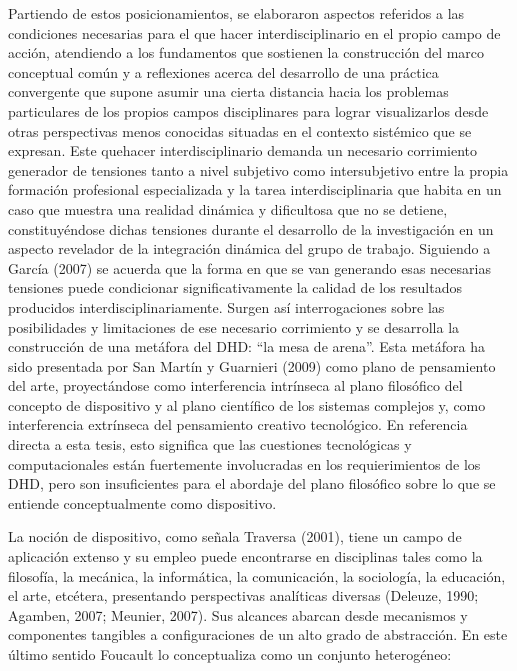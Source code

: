 Partiendo de estos posicionamientos, se elaboraron aspectos   
referidos   a    las  condiciones    necesarias   para   el  que hacer
interdisciplinario  en  el  propio   campo    de   acción,  atendiendo a   
los fundamentos que sostienen la construcción del marco conceptual común y a reflexiones acerca del desarrollo de una práctica convergente que
supone asumir una cierta distancia hacia los problemas particulares de los
propios    campos    disciplinares  para   lograr  visualizarlos  desde  otras
perspectivas menos conocidas situadas en el contexto sistémico que se
expresan. Este quehacer interdisciplinario demanda un necesario corrimiento   
generador de  tensiones   tanto  a  nivel   subjetivo como intersubjetivo
entre la propia formación profesional especializada y la tarea
interdisciplinaria que habita en un caso que muestra una realidad dinámica
y dificultosa que no se detiene, constituyéndose dichas tensiones durante
el desarrollo de la investigación en un aspecto revelador de la integración
dinámica del grupo de trabajo. Siguiendo a García (2007) se acuerda que la forma
en que se van generando esas necesarias tensiones puede condicionar
significativamente la calidad de los resultados producidos
interdisciplinariamente. Surgen así interrogaciones sobre las posibilidades
y limitaciones de ese necesario corrimiento y se desarrolla la construcción de una metáfora
del DHD: “la mesa de arena”. Esta metáfora ha sido presentada por San Martín y Guarnieri (2009) como
plano de pensamiento del arte, proyectándose como interferencia intrínseca al
plano filosófico del concepto de dispositivo y al plano científico de los
sistemas complejos y, como interferencia extrínseca del pensamiento creativo
tecnológico. En referencia directa a esta tesis, esto significa que las cuestiones tecnológicas y computacionales están fuertemente involucradas
en los requierimientos de los DHD, pero son insuficientes para el abordaje del plano filosófico sobre lo que se entiende conceptualmente como dispositivo. 

La noción de dispositivo, como señala Traversa (2001), tiene un
campo de aplicación extenso y su empleo puede encontrarse en disciplinas
tales como la filosofía, la mecánica, la informática, la comunicación, la
sociología, la educación, el arte, etcétera, presentando perspectivas
analíticas diversas (Deleuze, 1990; Agamben, 2007; Meunier, 2007). Sus
alcances abarcan  desde mecanismos y  componentes tangibles a
configuraciones de un alto grado de abstracción. En este último sentido
Foucault lo conceptualiza como un conjunto heterogéneo:
      
